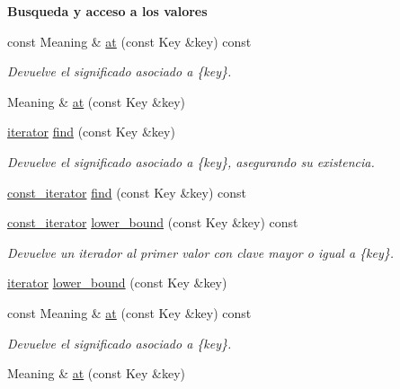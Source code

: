 \begin{Indent}{\bf \-Busqueda y acceso a los valores}\par
\begin{DoxyCompactItemize}
\item 
const \-Meaning \& \hyperlink{classaed2_1_1map_a0b0a11f906da2926f9eb342fcee79fd7}{at} (const \-Key \&key) const 
\begin{DoxyCompactList}\small\item\em \-Devuelve el significado asociado a \{key\}. \end{DoxyCompactList}\item 
\-Meaning \& \hyperlink{classaed2_1_1map_a6b21c09f59a83b6ee45432dcfa61f4a1}{at} (const \-Key \&key)
\item 
\hyperlink{classaed2_1_1map_1_1iterator}{iterator} \hyperlink{classaed2_1_1map_afd0fc1a8234888e61e0e615de7e245b8}{find} (const \-Key \&key)
\begin{DoxyCompactList}\small\item\em \-Devuelve el significado asociado a \{key\}, asegurando su existencia. \end{DoxyCompactList}\item 
\hyperlink{classaed2_1_1map_1_1const__iterator}{const\-\_\-iterator} \hyperlink{classaed2_1_1map_ab8f3e41b1a0d7b74645836f8d2e1acfc}{find} (const \-Key \&key) const 
\item 
\hyperlink{classaed2_1_1map_1_1const__iterator}{const\-\_\-iterator} \hyperlink{classaed2_1_1map_a3399d36fdd5a880b494f3a5795d3f18f}{lower\-\_\-bound} (const \-Key \&key) const 
\begin{DoxyCompactList}\small\item\em \-Devuelve un iterador al primer valor con clave mayor o igual a \{key\}. \end{DoxyCompactList}\item 
\hyperlink{classaed2_1_1map_1_1iterator}{iterator} \hyperlink{classaed2_1_1map_a07b3dd65557c59ee085e5f211269c6b3}{lower\-\_\-bound} (const \-Key \&key)
\item 
const \-Meaning \& \hyperlink{classaed2_1_1map_a0b0a11f906da2926f9eb342fcee79fd7}{at} (const \-Key \&key) const 
\begin{DoxyCompactList}\small\item\em \-Devuelve el significado asociado a \{key\}. \end{DoxyCompactList}\item 
\-Meaning \& \hyperlink{classaed2_1_1map_a6b21c09f59a83b6ee45432dcfa61f4a1}{at} (const \-Key \&key)
\item 

\end{DoxyCompactItemize}
\end{Indent}
